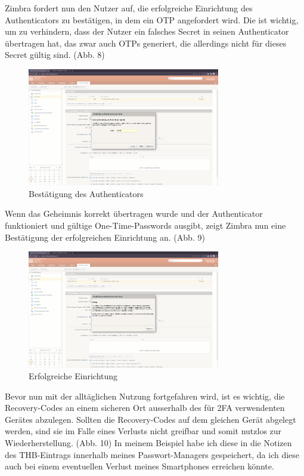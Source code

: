 \documentclass{article}
\begin{document}
Zimbra fordert nun den Nutzer auf, die erfolgreiche Einrichtung des
Authenticators zu bestätigen, in dem ein OTP angefordert wird. Die ist wichtig,
um zu verhindern, dass der Nutzer ein falsches Secret in seinen Authenticator
übertragen hat, das zwar auch OTPs generiert, die allerdings nicht für dieses
Secret gültig sind. (Abb. 8)

\begin{figure}[H]
	\includegraphics[width=0.75\textwidth]{./images/08-bestaetigung.png}
	\centering
	\caption{Bestätigung des Authenticators}
\end{figure}

Wenn das Geheimnis korrekt übertragen wurde und der Authenticator funktioniert
und gültige One-Time-Passwords ausgibt, zeigt Zimbra nun eine Bestätigung der
erfolgreichen Einrichtung an. (Abb. 9)

\begin{figure}[H]
	\includegraphics[width=0.75\textwidth]{./images/09-erfolg-zimbra.png}
	\centering
	\caption{Erfolgreiche Einrichtung}
\end{figure}

Bevor nun mit der alltäglichen Nutzung fortgefahren wird, ist es wichtig, die
Recovery-Codes an einem sicheren Ort ausserhalb des für 2FA verwendenten Gerätes
abzulegen. Sollten die Recovery-Codes auf dem gleichen Gerät abgelegt werden,
sind sie im Falle eines Verlusts nicht greifbar und somit nutzlos zur
Wiederherstellung. (Abb. 10) In meinem Beispiel habe ich diese in die Notizen des
THB-Eintrags innerhalb meines Passwort-Managers gespeichert, da ich diese auch
bei einem eventuellen Verlust meines Smartphones erreichen könnte.
\end{document}
